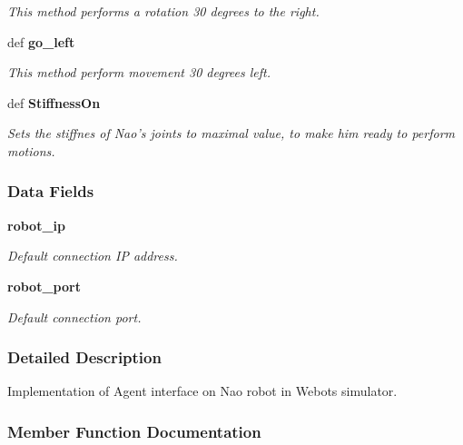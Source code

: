 \begin{DoxyCompactItemize}
\begin{DoxyCompactList}\small\item\em This method performs a rotation 30 degrees to the right. \end{DoxyCompactList}\item 
def {\bf go\+\_\+left}\label{class_nao_agent_1_1_nao_agent_a3661eec663302a3b67351833c2c9b8de}

\begin{DoxyCompactList}\small\item\em This method perform movement 30 degrees left. \end{DoxyCompactList}\item 
def {\bf Stiffness\+On}
\begin{DoxyCompactList}\small\item\em Sets the stiffnes of Nao's joints to maximal value, to make him ready to perform motions. \end{DoxyCompactList}\end{DoxyCompactItemize}
\subsubsection*{Data Fields}
\begin{DoxyCompactItemize}
\item 
{\bf robot\+\_\+ip}\label{class_nao_agent_1_1_nao_agent_a70221305bf8db6392330ef28121efd25}

\begin{DoxyCompactList}\small\item\em Default connection I\+P address. \end{DoxyCompactList}\item 
{\bf robot\+\_\+port}\label{class_nao_agent_1_1_nao_agent_a9282cdfa59976fe1cfc1a539df185c27}

\begin{DoxyCompactList}\small\item\em Default connection port. \end{DoxyCompactList}\end{DoxyCompactItemize}


\subsubsection{Detailed Description}
Implementation of Agent interface on Nao robot in Webots simulator. 

\subsubsection{Member Function Documentation}

